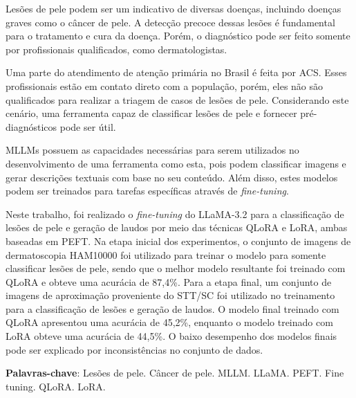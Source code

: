 \imprimircapa

\imprimirfolhaderosto*

\begin{fichacatalografica}
    
\end{fichacatalografica}





\setlength{\absparsep}{18pt}
\begin{resumo}
    \SingleSpacing
    Lesões de pele podem ser um indicativo de diversas doenças, incluindo doenças graves como o câncer de pele. A detecção
    precoce dessas lesões é fundamental para o tratamento e cura da doença. Porém, o diagnóstico pode ser feito somente por
    profissionais qualificados, como dermatologistas.

    Uma parte do atendimento de atenção primária no Brasil é feita por \ac{ACS}. Esses profissionais estão em contato
    direto com a população, porém, eles não são qualificados para realizar a triagem de casos de lesões de pele.
    Considerando este cenário, uma ferramenta capaz de classificar lesões de pele e fornecer pré-diagnósticos pode ser
    útil.

    \acp{MLLM} possuem as capacidades necessárias para serem utilizados no desenvolvimento de uma ferramenta como esta,
    pois podem classificar imagens e gerar descrições textuais com base no seu conteúdo. Além disso, estes modelos podem
    ser treinados para tarefas específicas através de \textit{fine-tuning}.


    Neste trabalho, foi realizado o \textit{fine-tuning} do \ac{LLaMA}-3.2 para a classificação de lesões de pele e geração
    de laudos por meio das técnicas \ac{QLoRA} e \ac{LoRA}, ambas baseadas em \ac{PEFT}. Na etapa inicial dos experimentos,
    o conjunto de imagens de dermatoscopia \ac{HAM10000} foi utilizado para treinar o modelo para somente classificar
    lesões de pele, sendo que o melhor modelo resultante foi treinado com \ac{QLoRA} e obteve uma acurácia de 87,4\%. Para
    a etapa final, um conjunto de imagens de aproximação proveniente do \ac{STT/SC} foi utilizado no treinamento para a
    classificação de lesões e geração de laudos. O modelo final treinado com \ac{QLoRA} apresentou uma acurácia de 45,2\%,
    enquanto o modelo treinado com \ac{LoRA} obteve uma acurácia de 44,5\%. O baixo desempenho dos modelos finais pode ser
    explicado por inconsistências no conjunto de dados.

    \textbf{Palavras-chave}: Lesões de pele. Câncer de pele. MLLM. LLaMA. PEFT. Fine tuning. QLoRA. LoRA.
\end{resumo}

